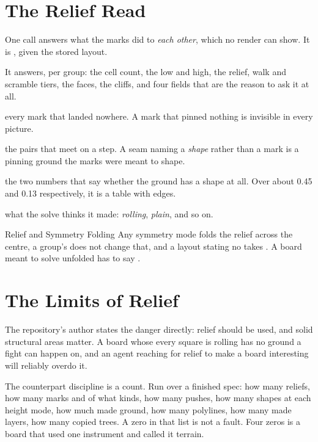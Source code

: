 \section{The Relief Read}

One call answers what the marks did to \emph{each other}, which no render can
show. It is
, given the stored layout.

It answers, per group: the cell count, the low and high, the relief, walk and
scramble tiers, the faces, the cliffs, and four fields that are the reason to ask
it at all.

\begin{description}[leftmargin=1.6em,style=nextline,itemsep=4pt]
  \item[\id{silentMarks}] every mark that landed nowhere. A mark that pinned nothing
    is invisible in every picture.
  \item[\id{seams}] the pairs that meet on a step. A seam naming a \emph{shape}
    rather than a mark is a  pinning ground the marks were meant
    to shape.
  \item[\id{level} and \id{largestField}] the two numbers that say whether the
    ground has a shape at all. Over about 0.45 and 0.13 respectively, it is a table
    with edges.
  \item[\id{landform}] what the solve thinks it made: \emph{rolling},
    \emph{plain}, and so on.
\end{description}

\begin{ruling}{Relief and Symmetry Folding}
Any symmetry mode folds the relief across the centre, a group's 
does not change that, and a layout stating no  takes
. A board meant to solve unfolded has to say .
\end{ruling}

\section{The Limits of Relief}

The repository's author states the danger directly: relief should be used, and
solid structural areas matter. A board whose every square is rolling has no ground
a fight can happen on, and an agent reaching for relief to make a board interesting
will reliably overdo it.

The counterpart discipline is a count. Run over a finished spec: how many reliefs,
how many marks and of what kinds, how many pushes, how many shapes at each height
mode, how much made ground, how many polylines, how many made layers, how many
copied trees. A zero in that list is not a fault. Four zeros is a board that used
one instrument and called it terrain.
